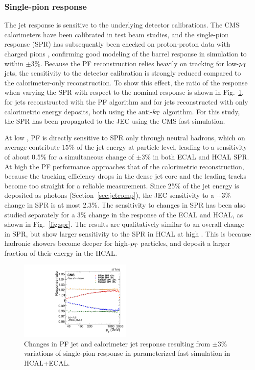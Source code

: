 \documentclass[11pt,twoside,a4paper,cmspaper,final,collab]{cms-tdr}
\begin{document}
\subsubsection*{Single-pion response}

The jet response is sensitive to the underlying detector calibrations. The CMS calorimeters have been calibrated in test beam studies, and the single-pion response (SPR) has subsequently been checked on proton-proton data with charged pions \cite{CMS-PAS-JME-10-008}, confirming good modeling of the barrel response in simulation to within $\pm 3$\%. Because the PF reconstruction relies heavily on tracking for low-$p_{\mathrm{T}}$ jets, the sensitivity to the detector calibration is strongly reduced compared to the calorimeter-only reconstruction. To show this effect, the ratio of the response when varying the SPR with respect to the nominal response is shown in Fig.~\ref{fig:spr_simultaneous}, for jets reconstructed with the PF algorithm and for jets reconstructed with only calorimetric energy deposits, both using the anti-$k_{\mathrm{T}}$ algorithm. For this study, the SPR has been propagated to the JEC using the CMS fast simulation.

At low \pt, PF is directly sensitive to SPR only through  neutral
hadrons, which on average contribute 15\% of the jet energy at particle level, leading
to a sensitivity of about 0.5\% for a simultaneous change of $\pm 3$\% in both ECAL and HCAL SPR. At high \pt the PF performance approaches that of the calorimetric reconstruction, because the tracking efficiency drops in the dense jet core and the leading tracks become too straight for a reliable \pt measurement.
Since 25\% of the jet energy is deposited as photons (Section~\ref{sec:jetcomp}), the JEC sensitivity to a $\pm 3$\% change in SPR is at most 2.3\%. The sensitivity to changes in SPR has been also studied separately for a $3$\% change in the response of the ECAL and HCAL, as shown in Fig.~\ref{fig:spr}. The results are qualitatively similar to an overall change in SPR, but show larger sensitivity to the SPR in HCAL at high \pt. This is because hadronic showers become deeper for high-$p_{\mathrm{T}}$ particles, and deposit a larger fraction of their energy in the HCAL.

\begin{figure}[htbp!]
\begin{center}
\includegraphics[width=0.49\textwidth]{Figure_012.pdf}
\end{center}
\caption{\label{fig:spr_simultaneous}
Changes in PF jet and calorimeter jet response resulting from $\pm 3$\% variations of single-pion response in parameterized fast simulation in HCAL+ECAL.
}
\end{figure}
\end{document}

